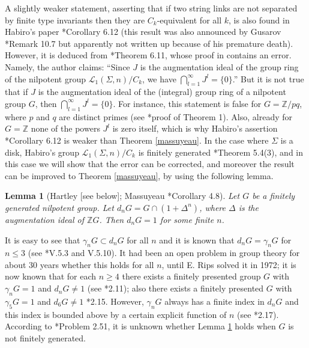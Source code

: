 \documentclass[a4paper,12pt,reqno,oneside]{amsart} %
\theoremstyle{plain}
\newtheorem{lemma}[theorem]{Lemma}
\theoremstyle{definition}
\theoremstyle{named}
\renewcommand{\:}{\colon}
\def\Z{\mathbb{Z}}
\def\L{\mathcal{L}}
\begin{document}
A slightly weaker statement, asserting that if two string links are not separated by finite type invariants 
then they are $C_k$-equivalent for all $k$, is also found in Habiro's paper \cite{Hab}*{Corollary 6.12}
(this result was also announced by Gusarov \cite{Gu2}*{Remark 10.7} but apparently not written up because of his premature death).
However, it is deduced from \cite{Hab}*{Theorem 6.11}, whose proof in \cite{Hab} contains an error.
Namely, the author claims: ``Since $J$ is the augmentation ideal of the group ring of the nilpotent group $\L_1(\Sigma,n)/C_k$, we
have $\bigcap_{l=1}^\infty J^l=\{0\}$.''
But it is not true that if $J$ is the augmentation ideal of the (integral) group ring of a nilpotent group $G$,
then $\bigcap_{l=1}^\infty J^l=\{0\}$.
For instance, this statement is false for $G=\Z/pq$, where $p$ and $q$ are distinct primes (see \cite{Bu}*{proof of Theorem 1}).
Also, already for $G=\Z$ none of the powers $J^l$ is zero itself, which is why Habiro's assertion \cite{Hab}*{Corollary 6.12}
is weaker than Theorem \ref{massuyeau}.
In the case where $\Sigma$ is a disk, Habiro's group $\L_1(\Sigma,n)/C_k$ is finitely generated \cite{Hab}*{Theorem 5.4(3)}, 
and in this case we will show that the error can be corrected, and moreover the result can be improved to Theorem \ref{massuyeau},
by using the following lemma.

\begin{lemma}[Hartley {[see below]}; Massuyeau \cite{Mass}*{Corollary 4.8}] \label{dim-subgroup} Let $G$ be a finitely generated nilpotent group.
Let $d_nG=G\cap(1+\Delta^n)$, where $\Delta$ is the augmentation ideal of $\Z G$.
Then $d_nG=1$ for some finite $n$.
\end{lemma}

It is easy to see that $\gamma_nG\subset d_nG$ for all $n$ and it is known that $d_nG=\gamma_nG$ for $n\le 3$ 
(see \cite{Pa}*{V.5.3 and V.5.10}).
It had been an open problem in group theory for about 30 years whether this holds for all $n$, until E. Rips solved it in 1972;
it is now known that for each $n\ge 4$ there exists a finitely presented group $G$ with $\gamma_nG=1$ and $d_nG\ne 1$ 
(see \cite{MiP}*{2.11}); also there exists a finitely presented $G$ with $\gamma_5G=1$ and $d_6G\ne 1$ \cite{MiP}*{2.15}.
However, $\gamma_nG$ always has a finite index in $d_nG$ and this index is bounded above 
by a certain explicit function of $n$ (see \cite{MiP}*{2.17}).
According to \cite{MiP}*{Problem 2.51}, it is unknown whether Lemma \ref{dim-subgroup} 
holds when $G$ is not finitely generated.
\end{document}
